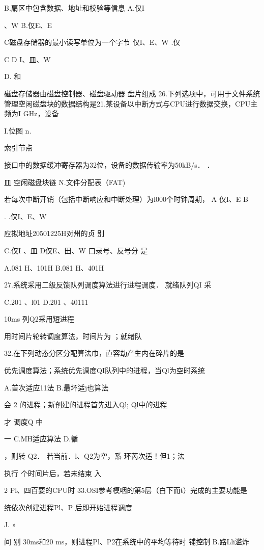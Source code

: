    B.扇区中包含数据、地址和校验等信息    A.仅I

    、W    B.仅E、E

   C磁盘存储器的最小读写单位为一个字节    仅I、E、W    .仅

    C    D   I、皿、W

   D.    和

    磁盘存储器由磁盘控制器、磁盘驱动器  盘片组成    26.下列选项中，可用于文件系统管理空闲磁盘块的数据结构是21.某设备以中断方式与CPU进行数据交换，CPU主频为I GHz，设备

    I.位图    n.

    索引节点

   接口中的数据缓冲寄存器为32位，设备的数据传输率为50kB/s．    ．

    皿 空闲磁盘块链    N.文件分配表（FAT)

   若每次中断开销（包括中断响应和中断处理）为l000个时钟周期，    A 仅I、E    B

    .    .仅I、E、W

    应拟地址20501225H对州的贞    别

   C.仅I 、皿    D仅E、田、W    口录号、反号分  是

    A.081 H、101H    B.081 H、401H

27.系统采用二级反馈队列调度算法进行进程调度． 就绪队列QI 采

    C.201  、l01     D.201  、40111

    10ms    列Q2采用短进程

   用时间片轮转调度算法，时间片为    ；就绪队

    32.在下列动态分区分配算法巾，直容劫产生内在碎片的是

   优先调度算法；系统优先调度QI队列中的进程，当Ql为空时系统

    A.首次适应11法    B.最坏适j也算法

    会    2  的进程；新创建的进程首先进入Ql; Ql中的进程

   才  调度Q 中

    一    C.MH适应算法    D.循

    ，则转   Q2． 若当前．l、Q2为空，系    环芮次适！但1；法

   执行 个时间片后，若未结束    入

    2    Pl、四百要的CPU时    33.OSI参考模咽的第5层（白下而t）完成的主要功能是

   统依次创建进程Pl、P 后即开始进程调度

    J. »

   间  别   30ms和20 ms，则进程Pl、P2在系统中的平均等待时    铺控制    B.路Lli滥炸

